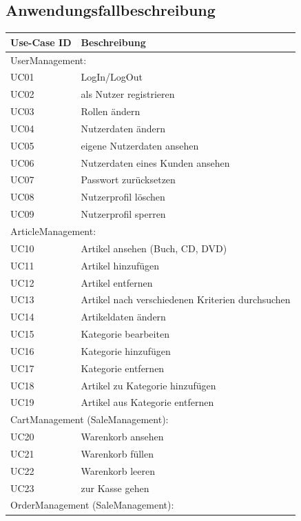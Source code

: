 \documentclass[a4paper]{article}
\begin{document}
\subsection{Anwendungsfallbeschreibung}

\begin{longtable}{|p{100px}|p{250px}|}
	\hline
	\rowcolor[HTML]{C0C0C0}
	Use-Case ID & Beschreibung \\ \hline
	\multicolumn{2}{|l|}{UserManagement:}  \\ \hline
	UC01 & LogIn/LogOut  \\ \hline
	UC02 & als Nutzer registrieren  \\ \hline
	UC03 & Rollen ändern \\ \hline
	UC04 & Nutzerdaten ändern  \\ \hline
	UC05 & eigene Nutzerdaten ansehen  \\ \hline
	UC06 & Nutzerdaten eines Kunden ansehen \\ \hline
	UC07 & Passwort zurücksetzen  \\ \hline
	UC08 & Nutzerprofil löschen \\ \hline
	UC09 & Nutzerprofil sperren \\ \hline
	\multicolumn{2}{|l|}{ArticleManagement:}  \\ \hline
	UC10 & Artikel ansehen (Buch, CD, DVD)  \\ \hline
	UC11 & Artikel hinzufügen  \\ \hline
	UC12 & Artikel entfernen  \\ \hline
	UC13 & Artikel nach verschiedenen Kriterien durchsuchen  \\ \hline
	UC14 & Artikeldaten ändern  \\ \hline
	UC15 & Kategorie bearbeiten  \\ \hline
	UC16 & Kategorie hinzufügen  \\ \hline
	UC17 & Kategorie entfernen  \\ \hline
	UC18 & Artikel zu Kategorie hinzufügen \\ \hline
	UC19 & Artikel aus Kategorie entfernen \\ \hline
	\multicolumn{2}{|l|}{CartManagement (SaleManagement):}  \\ \hline
	UC20 & Warenkorb ansehen  \\ \hline
	UC21 & Warenkorb füllen \\ \hline
	UC22 & Warenkorb leeren \\ \hline
	UC23 & zur Kasse gehen  \\ \hline
	\multicolumn{2}{|l|}{OrderManagement (SaleManagement):}  \\ \hline

\end{longtable}
\end{document}
